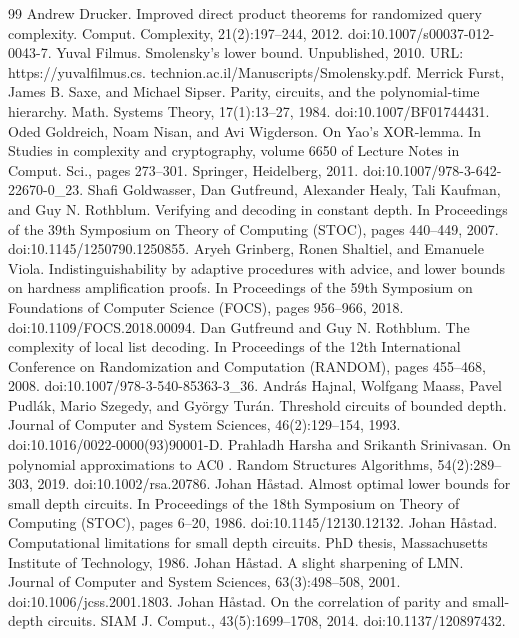 \begin{thebibliography}{99}
 Andrew Drucker. Improved direct product theorems for randomized query complexity. Comput. Complexity, 21(2):197–244, 2012. doi:10.1007/s00037-012-0043-7.
 Yuval Filmus. Smolensky’s lower bound. Unpublished, 2010. URL: https://yuvalfilmus.cs. technion.ac.il/Manuscripts/Smolensky.pdf.
 Merrick Furst, James B. Saxe, and Michael Sipser. Parity, circuits, and the polynomial-time hierarchy. Math. Systems Theory, 17(1):13–27, 1984. doi:10.1007/BF01744431.
 Oded Goldreich, Noam Nisan, and Avi Wigderson. On Yao’s XOR-lemma. In Studies in complexity and cryptography, volume 6650 of Lecture Notes in Comput. Sci., pages 273–301. Springer, Heidelberg, 2011. doi:10.1007/978-3-642-22670-0\_23.
 Shafi Goldwasser, Dan Gutfreund, Alexander Healy, Tali Kaufman, and Guy N. Rothblum. Verifying and decoding in constant depth. In Proceedings of the 39th Symposium on Theory of Computing (STOC), pages 440–449, 2007. doi:10.1145/1250790.1250855.
 Aryeh Grinberg, Ronen Shaltiel, and Emanuele Viola. Indistinguishability by adaptive procedures with advice, and lower bounds on hardness amplification proofs. In Proceedings of the 59th Symposium on Foundations of Computer Science (FOCS), pages 956–966, 2018. doi:10.1109/FOCS.2018.00094.
 Dan Gutfreund and Guy N. Rothblum. The complexity of local list decoding. In Proceedings of the 12th International Conference on Randomization and Computation (RANDOM), pages 455–468, 2008. doi:10.1007/978-3-540-85363-3\_36.
 András Hajnal, Wolfgang Maass, Pavel Pudlák, Mario Szegedy, and György Turán. Threshold circuits of bounded depth. Journal of Computer and System Sciences, 46(2):129–154, 1993. doi:10.1016/0022-0000(93)90001-D.
 Prahladh Harsha and Srikanth Srinivasan. On polynomial approximations to AC0 . Random Structures Algorithms, 54(2):289–303, 2019. doi:10.1002/rsa.20786.
 Johan Håstad. Almost optimal lower bounds for small depth circuits. In Proceedings of the 18th Symposium on Theory of Computing (STOC), pages 6–20, 1986. doi:10.1145/12130.12132.
 Johan Håstad. Computational limitations for small depth circuits. PhD thesis, Massachusetts Institute of Technology, 1986.
 Johan Håstad. A slight sharpening of LMN. Journal of Computer and System Sciences, 63(3):498–508, 2001. doi:10.1006/jcss.2001.1803.
 Johan Håstad. On the correlation of parity and small-depth circuits. SIAM J. Comput., 43(5):1699–1708, 2014. doi:10.1137/120897432.

\end{thebibliography}
